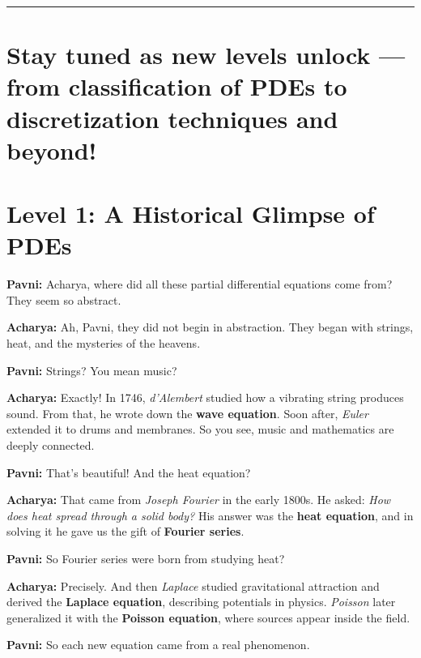 \documentclass[
  letterpaper,
]{book}
\begin{document}
\begin{center}\rule{0.5\linewidth}{0.5pt}\end{center}


\chapter{Stay tuned as new levels unlock --- from classification of PDEs
to discretization techniques and
beyond!}\label{stay-tuned-as-new-levels-unlock-from-classification-of-pdes-to-discretization-techniques-and-beyond}


\chapter{Level 1: A Historical Glimpse of
PDEs}\label{level-1-a-historical-glimpse-of-pdes}

\textbf{Pavni:} Acharya, where did all these partial differential
equations come from? They seem so abstract.

\textbf{Acharya:} Ah, Pavni, they did not begin in abstraction. They
began with strings, heat, and the mysteries of the heavens.

\textbf{Pavni:} Strings? You mean music?

\textbf{Acharya:} Exactly! In 1746, \emph{d'Alembert} studied how a
vibrating string produces sound. From that, he wrote down the
\textbf{wave equation}. Soon after, \emph{Euler} extended it to drums
and membranes. So you see, music and mathematics are deeply connected.

\textbf{Pavni:} That's beautiful! And the heat equation?

\textbf{Acharya:} That came from \emph{Joseph Fourier} in the early
1800s. He asked: \emph{How does heat spread through a solid body?} His
answer was the \textbf{heat equation}, and in solving it he gave us the
gift of \textbf{Fourier series}.

\textbf{Pavni:} So Fourier series were born from studying heat?

\textbf{Acharya:} Precisely. And then \emph{Laplace} studied
gravitational attraction and derived the \textbf{Laplace equation},
describing potentials in physics. \emph{Poisson} later generalized it
with the \textbf{Poisson equation}, where sources appear inside the
field.

\textbf{Pavni:} So each new equation came from a real phenomenon.
\end{document}
